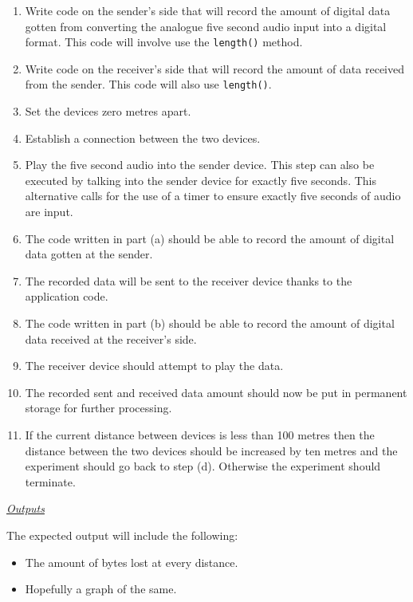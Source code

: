 \documentclass[12pt,svgnames,smaller]{article} %
\begin{document}
\begin{enumerate}
\begin{enumerate}
			\begin{enumerate}
				\item Write code on the sender’s side that will record the amount of digital data gotten from converting the analogue five second audio input into a digital format. This code will involve use the \texttt{length()} method.
				\item Write code on the receiver’s side that will record the amount of data received from the sender. This code will also use \texttt{length()}.
				\item Set the devices zero metres apart.
				\item Establish a connection between the two devices.
				\item Play the five second audio into the sender device. This step can also be executed by talking into the sender device for exactly five seconds. This alternative calls for the use of a timer to ensure exactly five seconds of audio are input.
				\item The code written in part (a) should be able to record the amount of digital data gotten at the sender.
				\item The recorded data will be sent to the receiver device thanks to the application code.
				\item The code written in part (b) should be able to record the amount of digital data received at the receiver’s side.
				\item The receiver device should attempt to play the data. 
				\item The recorded sent and received data amount should now be put in permanent storage for further processing.
				\item If the current distance between devices is less than 100 metres then the distance between the two devices should be increased by ten metres and the experiment should go back to step (d). Otherwise the experiment should terminate. 
			\end{enumerate}
							
			\emph{\underline{\textsf{Outputs}}}

			The expected output will include the following:
			
			\begin{itemize}
				\item The amount of bytes lost at every distance.
				\item Hopefully a graph of the same.
			\end{itemize}
			

\end{enumerate}
\end{enumerate}
\end{document}
